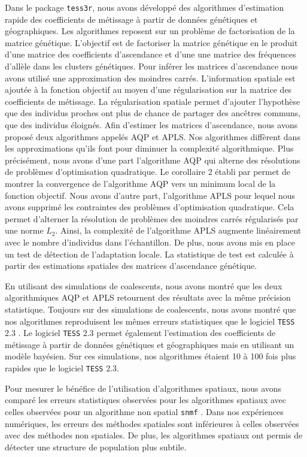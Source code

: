 \documentclass[12pt,a4paper,twoside]{ugathesis}
\begin{document}
Dans le package \texttt{tess3r}, nous avons développé des algorithmes d'estimation
rapide des coefficients de métissage à partir de données génétiques et
géographiques. Les algorithmes reposent sur un problème de factorisation de la
matrice génétique. L'objectif est de factoriser la matrice génétique en le
produit d'une matrice des coefficients d'ascendance et d'une une matrice des
fréquences d'allèle dans les clusters génétiques. Pour inférer les matrices
d'ascendance nous avons utilisé une approximation des moindres carrés.
L'information spatiale est ajoutée à la fonction objectif au moyen d'une
régularisation sur la matrice des coefficients de métissage. La régularisation
spatiale permet d'ajouter l'hypothèse que des individus proches ont plus de
chance de partager des ancêtres communs, que des individus éloignés. Afin
d'estimer les matrices d'ascendance, nous avons proposé deux algorithmes appelés
AQP et APLS. Nos algorithmes diffèrent dans les approximations qu'ils font pour
diminuer la complexité algorithmique. Plus précisément, nous avons d'une part
l'algorithme AQP qui alterne des résolutions de problèmes d'optimisation
quadratique. Le corollaire 2 établi par \citet{Grippo_2000} permet de montrer la
convergence de l'algorithme AQP vers un minimum local de la fonction objectif.
Nous avons d'autre part, l'algorithme APLS pour lequel nous avons supprimé les
contraintes des problèmes d'optimisation quadratique. Cela permet d'alterner la
résolution de problèmes des moindres carrés régularisés par une norme \(L_{2}\).
Ainsi, la complexité de l'algorithme APLS augmente linéairement avec le nombre
d'individus dans l'échantillon. De plus, nous avons mis en place un test de
détection de l'adaptation locale. La statistique de test est calculée à partir
des estimations spatiales des matrices d'ascendance génétique.

En utilisant des simulations de coalescents, nous avons montré que les deux
algorithmiques AQP et APLS retournent des résultats avec la même précision
statistique. Toujours sur des simulations de coalescents, nous avons montré que
nos algorithmes reproduisent les mêmes erreurs statistiques que le logiciel
\texttt{TESS} 2.3 \cite{CHEN_2007}. Le logiciel \texttt{TESS} 2.3 permet également l'estimation
des coefficients de métissage à partir de données génétiques et géographiques mais
en utilisant un modèle bayésien. Sur ces simulations, nos algorithmes étaient 10
à 100 fois plus rapides que le logiciel \texttt{TESS} 2.3.

Pour mesurer le bénéfice de l'utilisation d'algorithmes spatiaux, nous avons
comparé les erreurs statistiques observées pour les algorithmes spatiaux avec
celles observées pour un algorithme non spatial \texttt{snmf} \cite{Frichot_2014}. Dans
nos expériences numériques, les erreurs des méthodes spatiales sont inférieures
à celles observées avec des méthodes non spatiales. De plus, les algorithmes
spatiaux ont permis de détecter une structure de population plus subtile.
\end{document}
